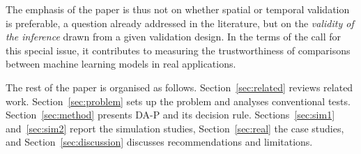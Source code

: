 The emphasis of the paper is thus not on whether spatial or temporal validation is preferable, a question already addressed in the literature, but on the \emph{validity of the inference} drawn from a given validation design. In the terms of the call for this special issue, it contributes to measuring the trustworthiness of comparisons between machine learning models in real applications.

The rest of the paper is organised as follows. Section~\ref{sec:related} reviews related work. Section~\ref{sec:problem} sets up the problem and analyses conventional tests. Section~\ref{sec:method} presents DA-P and its decision rule. Sections~\ref{sec:sim1} and~\ref{sec:sim2} report the simulation studies, Section~\ref{sec:real} the case studies, and Section~\ref{sec:discussion} discusses recommendations and limitations.
